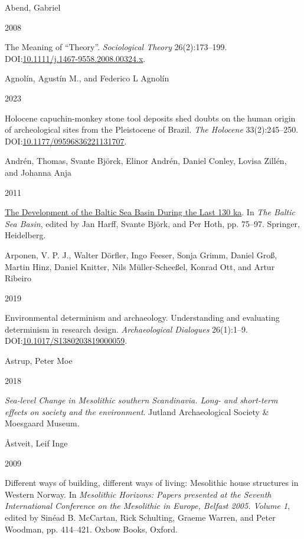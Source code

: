 \documentclass[
  a4paper,
  oneside]{uiophdthesis}
\newlength{\cslhangindent}
\newlength{\csllabelwidth}
\newlength{\cslentryspacingunit} %
\newenvironment{CSLReferences}[2] %
 {%
  \setlength{\parindent}{0pt}
  \ifodd #1
  \let\oldpar\par
  \def\par{\hangindent=\cslhangindent\oldpar}
  \fi
  \setlength{\parskip}{#2\cslentryspacingunit}
 }%
 {}
\newcommand{\CSLBlock}[1]{#1\hfill\break}
\newcommand{\CSLLeftMargin}[1]{\parbox[t]{\csllabelwidth}{#1}}
\newcommand{\CSLRightInline}[1]{\parbox[t]{\linewidth - \csllabelwidth}{#1}\break}
\begin{document}
\hypertarget{refs}{}
\begin{CSLReferences}{0}{0}
\leavevmode{}%
\CSLBlock{Abend, Gabriel}
\CSLLeftMargin{ 2008}
\CSLRightInline{{The Meaning of {``Theory''}}. \emph{Sociological Theory} 26(2):173--199. DOI:\href{https://doi.org/10.1111/j.1467-9558.2008.00324.x}{10.1111/j.1467-9558.2008.00324.x}.}

\leavevmode{}%
\CSLBlock{Agnolín, Agustín M., and Federico L Agnolín}
\CSLLeftMargin{ 2023}
\CSLRightInline{{Holocene capuchin-monkey stone tool deposits shed doubts on the human origin of archeological sites from the Pleistocene of Brazil}. \emph{The Holocene} 33(2):245--250. DOI:\href{https://doi.org/10.1177/09596836221131707}{10.1177/09596836221131707}.}

\leavevmode{}%
\CSLBlock{Andrén, Thomas, Svante Björck, Elinor Andrén, Daniel Conley, Lovisa Zillén, and Johanna Anja}
\CSLLeftMargin{ 2011}
\CSLRightInline{\href{https://doi.org/10.1007/978-3-642-17220-5_4}{{The Development of the Baltic Sea Basin During the Last 130 ka}}. In \emph{{The Baltic Sea Basin}}, edited by Jan Harff, Svante Björk, and Per Hoth, pp. 75--97. Springer, Heidelberg.}

\leavevmode{}%
\CSLBlock{Arponen, V. P. J., Walter Dörfler, Ingo Feeser, Sonja Grimm, Daniel Groß, Martin Hinz, Daniel Knitter, Nils Müller-Scheeßel, Konrad Ott, and Artur Ribeiro}
\CSLLeftMargin{ 2019}
\CSLRightInline{{Environmental determinism and archaeology. Understanding and evaluating determinism in research design}. \emph{Archaeological Dialogues} 26(1):1--9. DOI:\href{https://doi.org/10.1017/S1380203819000059}{10.1017/S1380203819000059}.}

\leavevmode{}%
\CSLBlock{Astrup, Peter Moe}
\CSLLeftMargin{ 2018}
\CSLRightInline{\emph{{Sea-level Change in Mesolithic southern Scandinavia. Long- and short-term effects on society and the environment}}. Jutland Archaeological Society \& Moesgaard Museum.}

\leavevmode{}%
\CSLBlock{Åstveit, Leif Inge}
\CSLLeftMargin{ 2009}
\CSLRightInline{{Different ways of building, different ways of living: Mesolithic house structures in Western Norway}. In \emph{{Mesolithic Horizons: Papers presented at the Seventh International Conference on the Mesolithic in Europe, Belfast 2005. Volume 1}}, edited by Sinéad B. McCartan, Rick Schulting, Graeme Warren, and Peter Woodman, pp. 414--421. Oxbow Books, Oxford.}


\end{CSLReferences}
\end{document}
